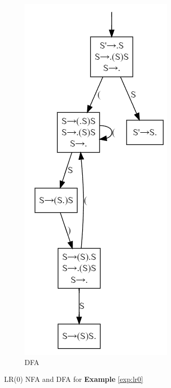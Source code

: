 \begin{figure}[!htb]
\begin{subfigure}{0.22\textwidth}
    \end{subfigure}
    \begin{subfigure}{0.22\textwidth}
        \centering
        \includegraphics[height=2\textwidth]{pic/CP3/expdfa.png}
        \caption{DFA}
    \end{subfigure}
    \caption{LR(0) NFA and DFA for \textbf{Example} \ref{exp:lr0}}
\end{figure}



